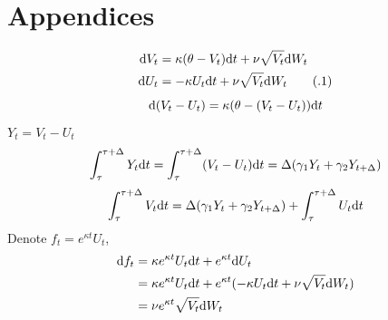 \documentclass{ws-ijfe}
\newcommand\numberthis{\addtocounter{equation}{1}\tag{\theequation}}
\begin{document}

\appendix

\section{Appendices}

\begin{align*}
    \d V_t &= \kappa(\theta-V_t)\d t +\nu\sqrt{V_t}\d W_t\\
    \d U_t &= -\kappa U_t\d t + \nu\sqrt{V_t}\d W_t\numberthis\label{appeqnV_t}\\
\end{align*}
\begin{equation*}
  \mathrm{d} (V_t-U_t) = \kappa(\theta-(V_t-U_t))\mathrm{d} t
\end{equation*}
$Y_t=V_t-U_t$\\
\begin{equation*}
  \int_{\tau}^{\tau+\Delta}Y_t\mathrm{d} t = \int_{\tau}^{\tau+\Delta}(V_t-U_t)\mathrm{d} t = \Delta(\gamma_1Y_t+\gamma_2Y_{t+\Delta})
\end{equation*}
\begin{equation*}
  \int_{\tau}^{\tau+\Delta}V_t\mathrm{d} t = \Delta(\gamma_1Y_t+\gamma_2Y_{t+\Delta})+\int_{\tau}^{\tau+\Delta}U_t\mathrm{d} t
\end{equation*}
Denote $f_t=e^{\kappa t}U_t$,
\begin{equation*}
  \begin{split}
     \mathrm{d} f_t & = \kappa e^{\kappa t}U_t\mathrm{d} t + e^{\kappa t}\mathrm{d} U_t \\
       & = \kappa e^{\kappa t}U_t \mathrm{d} t +e^{\kappa t}(-\kappa U_t\mathrm{d} t+\nu\sqrt{V_t}\mathrm{d} W_t) \\
       &= \nu e^{\kappa t}\sqrt{V_t}\mathrm{d} W_t
  \end{split}
\end{equation*}
\end{document}
